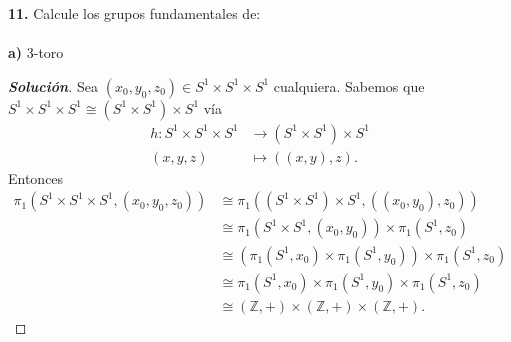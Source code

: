 \textbf{11.} Calcule los grupos fundamentales de:\\\\
\textbf{a)} 3-toro
\begin{proof}[\textbf{Solución}]
Sea $(x_0,y_0,z_0)\in S^1\times S^1\times S^1$ cualquiera. Sabemos que $S^1\times S^1\times S^1\cong(S^1\times S^1)\times S^1$ vía
\begin{align*}
h:S^1\times S^1\times S^1&\longrightarrow(S^1\times S^1)\times S^1\\
(x,y,z)&\longmapsto((x,y),z).
\end{align*}
Entonces
\begin{align*}
\pi_1(S^1\times S^1\times S^1,(x_0,y_0,z_0))&\cong\pi_1((S^1\times S^1)\times S^1,((x_0,y_0),z_0))\\
&\cong\pi_1(S^1\times S^1,(x_0,y_0))\times\pi_1(S^1,z_0)\\
&\cong(\pi_1(S^1,x_0)\times\pi_1(S^1,y_0))\times\pi_1(S^1,z_0)\\
&\cong\pi_1(S^1,x_0)\times\pi_1(S^1,y_0)\times\pi_1(S^1,z_0)\\
&\cong(\mathbb{Z},+)\times(\mathbb{Z},+)\times(\mathbb{Z},+).
\end{align*}
\end{proof}

